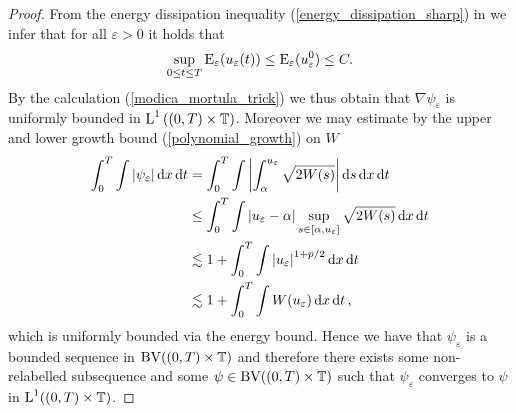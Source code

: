 \begin{proof}
	From the energy dissipation inequality (\ref{energy_dissipation_sharp}) in 
	 we infer that for all $ \varepsilon > 0 $ 
	it holds that
	\begin{equation}
		\label{unif_bound_on_energies}
		\sup_{ 0 \leq t \leq T }
		\operatorname{E}_{ \varepsilon } ( u_{ \varepsilon } ( t ) ) 
		\leq
		\operatorname{E}_{ \varepsilon } ( u_{ \varepsilon}^{ 0 } )
		\leq C.
	\end{equation}
	By the calculation (\ref{modica_mortula_trick}) we thus obtain that $ 
	\nabla 
	\psi_{ \varepsilon } $ is uniformly bounded in $ \operatorname{L}^{ 1 } \left( ( 0 , T ) 
	\times \operatorname{\mathbb{T}} \right) $.
	Moreover we may estimate by the upper and lower growth bound 
	(\ref{polynomial_growth}) on $ W $ 
	\begin{align}
		\int_{ 0 }^{ T }
		\int
		\abs{ \psi_{ \varepsilon } }
		\dd{ x }
		\dd{ t }
		& =
		\int_{ 0 }^{ T }
		\int
		\abs{
			\int_{ \alpha }^{ u_{ \varepsilon } }
			\sqrt{ 2 W ( s ) }
		}
		\dd{ s }
		\dd{ x }
		\dd{ t }
		\notag
		\\
		& \leq
		\int_{ 0 }^{ T }
		\int
		\abs{ u_{ \varepsilon } - \alpha }
		\sup_{ s \in [ \alpha, u_{ \varepsilon } ] }
		\sqrt{ 2 W ( s ) }
		\dd{ x }
		\dd{ t }
		\notag
		\\
		& \lesssim
		1 + 
		\int_{ 0 }^{ T }
		\int
		\abs{ u_{ \varepsilon } }^{ 1 + p/ 2 }
		\dd{ x }
		\dd{ t }
		\notag
		\\
		& \lesssim
		1 + 
		\int_{ 0 }^{ T }
		\int
		W ( u_{ \varepsilon } )
		\dd{ x }
		\dd{ t },
		\label{l1_estimate_for_psi_epsilon}
	\end{align}
	which is uniformly bounded via the energy bound. Hence we have that $ 
	\psi_{ \varepsilon } $ is a bounded sequence in $ \operatorname{BV}( ( 0 , T ) \times 
	\operatorname{\mathbb{T}} ) $ and therefore there exists some non-relabelled subsequence 
	and some $ \psi \in \operatorname{BV} ( ( 0 , T ) \times \operatorname{\mathbb{T}} ) $ such that $ 
	\psi_{ \varepsilon } $ converges to $ \psi $ in $ \operatorname{L}^{ 1 } ( ( 0 , T ) 
	\times \operatorname{\mathbb{T}} ) $.
	

\end{proof}
